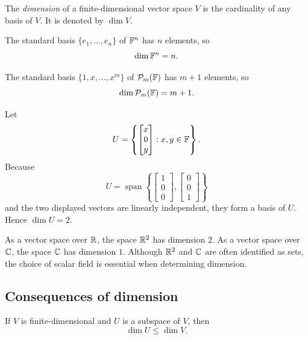 \begin{definition}[Dimension]
  The \emph{dimension} of a finite-dimensional vector space $V$ is the
  cardinality of any basis of $V$. It is denoted by $\dim V$.
\end{definition}

\begin{example}
  The standard basis $\{e_1,\ldots,e_n\}$ of $\mathbb{F}^n$ has $n$
  elements, so
  \[
    \dim\mathbb{F}^n=n.
  \]
\end{example}

\begin{example}
  The standard basis $\{1,x,\ldots,x^m\}$ of
  $\mathcal P_m(\mathbb{F})$ has $m+1$ elements, so
  \[
    \dim\mathcal P_m(\mathbb{F})=m+1.
  \]
\end{example}

\begin{example}
  Let
  \[
    U=\left\{
      \begin{bmatrix}x\\0\\y\end{bmatrix}:x,y\in\mathbb{F}
    \right\}.
  \]
  Because
  \[
    U=\operatorname{span}\left\{
      \begin{bmatrix}1\\0\\0\end{bmatrix},
      \begin{bmatrix}0\\0\\1\end{bmatrix}
    \right\}
  \]
  and the two displayed vectors are linearly independent, they form a
  basis of $U$. Hence $\dim U=2$.
\end{example}

\begin{example}
  As a vector space over $\mathbb{R}$, the space $\mathbb{R}^2$ has dimension
  $2$. As a vector space over $\mathbb{C}$, the space $\mathbb{C}$ has dimension
  $1$. Although $\mathbb{R}^2$ and $\mathbb{C}$ are often identified as sets,
  the choice of scalar field is essential when determining dimension.
\end{example}

\subsection{Consequences of dimension}

\begin{proposition}
  If $V$ is finite-dimensional and $U$ is a subspace of $V$, then
  \[
    \dim U\leq\dim V.
  \]
\end{proposition}


